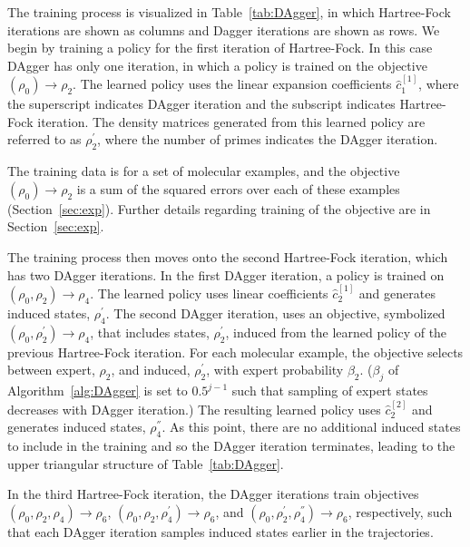 \documentclass[twoside,11pt]{article}
\begin{document}

The training process is visualized in Table~\ref{tab:DAgger}, in which Hartree-Fock iterations are shown as columns and Dagger iterations are shown as rows. We begin by training a policy for the first iteration of Hartree-Fock. In this case DAgger has only one iteration, in which a policy is trained on the objective $(\rho_0) \rightarrow \rho_2$. The learned policy uses the linear expansion coefficients $\hat{c}^{[1]}_1$, where the superscript indicates DAgger iteration and the subscript indicates Hartree-Fock iteration. The density matrices generated from this learned policy are referred to as $\rho_2^{'}$, where the number of primes indicates the DAgger iteration.

The training data is for a set of molecular examples, and the objective $(\rho_0) \rightarrow \rho_2$ is a sum of the squared errors over each of these examples (Section~\ref{sec:exp}). Further details regarding training of the objective are in Section~\ref{sec:exp}. 

The training process then moves onto the second Hartree-Fock iteration, which has two DAgger iterations. In the first DAgger iteration, a policy is trained on $(\rho_0, \rho_2) \rightarrow \rho_4$. The learned policy uses linear coefficients $\hat{c}^{[1]}_2$ and generates induced states, $\rho_4^{'}$. The second DAgger iteration, uses an objective, symbolized $(\rho_0, \rho_2^{'}) \rightarrow \rho_4$, that includes states, $\rho_2^{'}$, induced from the learned policy of the previous Hartree-Fock iteration. For each molecular example, the objective selects between expert, $\rho_2$, and induced, $\rho_2^{'}$, with expert probability $\beta_2$. ($\beta_j$ of Algorithm~\ref{alg:DAgger} is set to $0.5^{j-1}$ such that sampling of expert states decreases with DAgger iteration.) The resulting learned policy uses $\hat{c}^{[2]}_2$ and generates induced states, $\rho_4^{''}$. As this point, there are no additional induced states to include in the training and so the DAgger iteration terminates, leading to the upper triangular structure of Table~\ref{tab:DAgger}.

In the third Hartree-Fock iteration, the DAgger iterations train objectives $(\rho_0, \rho_2, \rho_4) \rightarrow \rho_6$, $(\rho_0, \rho_2, \rho_4^{'}) \rightarrow \rho_6$, and $(\rho_0, \rho_2^{'}, \rho_{4}^{''}) \rightarrow \rho_6$, respectively, such that each DAgger iteration samples induced states earlier in the trajectories.  
\end{document}
